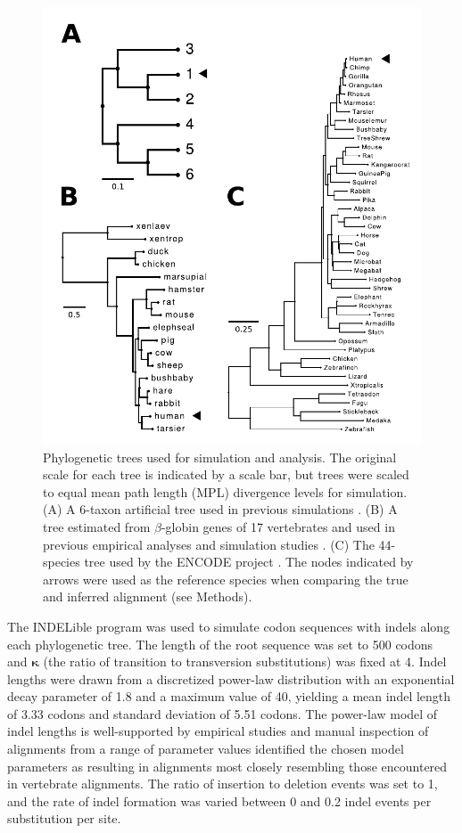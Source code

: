 \begin{figure}[t!]
\centering
\includegraphics[scale=0.6]{Figs/fig1.pdf}
\caption{Phylogenetic trees used for simulation and analysis. The
  original scale for each tree is indicated by a scale bar, but trees
  were scaled to equal mean path length (MPL) divergence levels for
  simulation. (A) A 6-taxon artificial tree used in previous
  simulations
  \citep{Anisimova2001Accuracy,Massingham2005Detecting}. (B) A tree
  estimated from $\beta$-globin genes of 17 vertebrates and used in
  previous empirical analyses and simulation studies
  \citep{Anisimova2001Accuracy,Anisimova2002Accuracy}. (C) The
  44-species tree used by the ENCODE project
  \citep{2007Identification,Nikolaev2007Early}. The nodes indicated by
  arrows were used as the reference species when comparing the true
  and inferred alignment (see Methods).}
\label{fig_1}
\end{figure}

The INDELible program \citep{Fletcher2009INDELible} was used to
simulate codon sequences with indels along each phylogenetic tree. The
length of the root sequence was set to 500 codons and $\bm{\kappa}$ (the
ratio of transition to transversion substitutions) was fixed at 4.
Indel lengths were drawn from a discretized
power-law distribution with an exponential decay parameter of 1.8 and
a maximum value of 40, yielding a mean indel length of 3.33 codons and
standard deviation of 5.51 codons. The power-law model of indel
lengths is well-supported by empirical studies
\citep{Benner1993Empirical,Cartwright2009Problems} and manual
inspection of alignments from a range of parameter values identified
the chosen model parameters as resulting in alignments most closely
resembling those encountered in vertebrate alignments. The ratio of
insertion to deletion events was set to 1, and the rate of indel
formation was varied between 0 and 0.2 indel events per substitution
per site.

